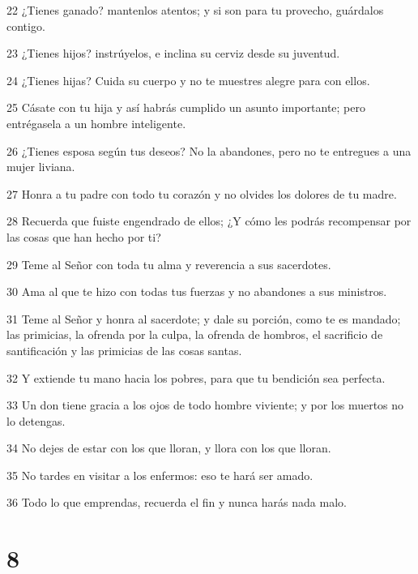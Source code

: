 \par 22 ¿Tienes ganado? mantenlos atentos; y si son para tu provecho, guárdalos contigo.
\par 23 ¿Tienes hijos? instrúyelos, e inclina su cerviz desde su juventud.
\par 24 ¿Tienes hijas? Cuida su cuerpo y no te muestres alegre para con ellos.
\par 25 Cásate con tu hija y así habrás cumplido un asunto importante; pero entrégasela a un hombre inteligente.
\par 26 ¿Tienes esposa según tus deseos? No la abandones, pero no te entregues a una mujer liviana.
\par 27 Honra a tu padre con todo tu corazón y no olvides los dolores de tu madre.
\par 28 Recuerda que fuiste engendrado de ellos; ¿Y cómo les podrás recompensar por las cosas que han hecho por ti?
\par 29 Teme al Señor con toda tu alma y reverencia a sus sacerdotes.
\par 30 Ama al que te hizo con todas tus fuerzas y no abandones a sus ministros.
\par 31 Teme al Señor y honra al sacerdote; y dale su porción, como te es mandado; las primicias, la ofrenda por la culpa, la ofrenda de hombros, el sacrificio de santificación y las primicias de las cosas santas.
\par 32 Y extiende tu mano hacia los pobres, para que tu bendición sea perfecta.
\par 33 Un don tiene gracia a los ojos de todo hombre viviente; y por los muertos no lo detengas.
\par 34 No dejes de estar con los que lloran, y llora con los que lloran.
\par 35 No tardes en visitar a los enfermos: eso te hará ser amado.
\par 36 Todo lo que emprendas, recuerda el fin y nunca harás nada malo.

\chapter{8}

